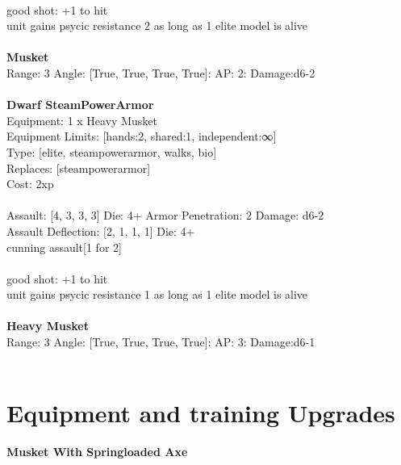 \ \\
good shot: +1 to hit\\ 
unit gains psycic resistance 2 as long as 1 elite model is alive\\ 

\ \\
{\bf Musket } \\



Range: 3  Angle: [True, True, True, True]: AP: 2: Damage:d6-2 \\




 
\ \\

{\bf Dwarf SteamPowerArmor } \\
Equipment: 1 x Heavy Musket \\
Equipment Limits: [hands:2, shared:1, independent:∞] \\
Type: [elite, steampowerarmor, walks, bio] \\
Replaces: [steampowerarmor] \\
Cost: 2xp\\
\ \\
Assault: [4, 3, 3, 3] Die: 4+ Armor Penetration: 2 Damage: d6-2 \\
Assault Deflection: [2, 1, 1, 1] Die: 4+\\
\indent cunning assault[1 for 2]\\ 
 
\ \\
good shot: +1 to hit\\ 
unit gains psycic resistance 1 as long as 1 elite model is alive\\ 

\ \\
{\bf Heavy Musket } \\



Range: 3  Angle: [True, True, True, True]: AP: 3: Damage:d6-1 \\




 
\ \\

\section{Equipment and training Upgrades}{\bf Musket With Springloaded Axe } \\

